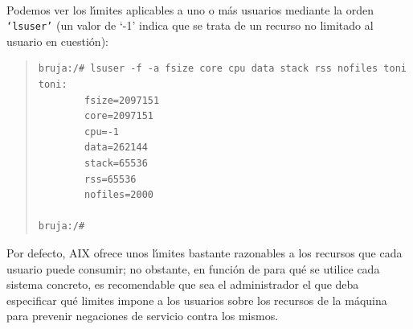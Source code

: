 \\Podemos ver los l\'{\i}mites aplicables a uno o m\'as usuarios mediante la 
orden {\tt `lsuser'} (un valor de `-1' indica que se trata de un recurso no
limitado al usuario en cuesti\'on):
\begin{quote}
\begin{verbatim}
bruja:/# lsuser -f -a fsize core cpu data stack rss nofiles toni
toni:
        fsize=2097151
        core=2097151
        cpu=-1
        data=262144
        stack=65536
        rss=65536
        nofiles=2000

bruja:/# 
\end{verbatim}
\end{quote}
Por defecto, AIX ofrece unos l\'{\i}mites bastante razonables a los recursos que
cada usuario puede consumir; no obstante, en funci\'on de para qu\'e se utilice
cada sistema concreto, es recomendable que sea el administrador el que deba 
especificar qu\'e limites impone a los usuarios sobre los recursos de la
m\'aquina para prevenir negaciones de servicio contra los mismos.
